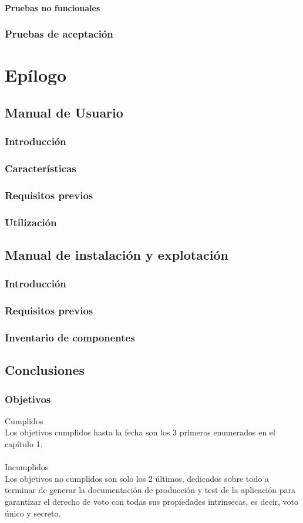 \documentclass[12pt,letterpaper]{report}
\begin{document}
		\subsubsection{Pruebas no funcionales}
	\subsection{Pruebas de aceptación}
\chapter{Epílogo}
\section{Manual de Usuario}
	\subsection{Introducción}
	\subsection{Características}
	\subsection{Requisitos previos}
	\subsection{Utilización}

\section{Manual de instalación y explotación}
	\subsection{Introducción}
	\subsection{Requisitos previos}
	\subsection{Inventario de componentes}

\section{Conclusiones}
	\subsection{Objetivos}
		\noindent Cumplidos\\
		Los objetivos cumplidos hasta la fecha son los 3 primeros enumerados en el capítulo 1.
		\\~\\
		\noindent Incumplidos\\
		Los objetivos no cumplidos son solo los 2 últimos, dedicados sobre todo a terminar de generar la
		documentación de producción y test de la aplicación para garantizar el derecho de voto con todas
		sus propiedades intrinsecas, es decir, voto único y secreto.
\end{document}
